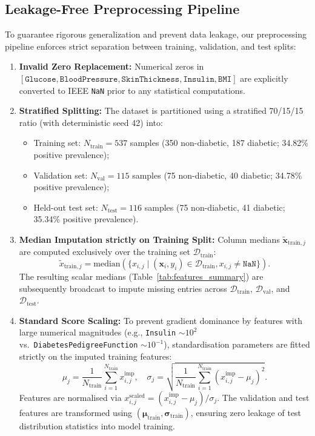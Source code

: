 \documentclass[11pt,a4paper]{article}
\begin{document}
\subsection{Leakage-Free Preprocessing Pipeline}
To guarantee rigorous generalization and prevent data leakage, our preprocessing pipeline enforces strict separation between training, validation, and test splits:
\begin{enumerate}[leftmargin=*]
    \item \textbf{Invalid Zero Replacement:} Numerical zeros in $[\texttt{Glucose}, \texttt{BloodPressure}, \texttt{SkinThickness}, \texttt{Insulin}, \texttt{BMI}]$ are explicitly converted to IEEE \texttt{NaN} prior to any statistical computations.
    \item \textbf{Stratified Splitting:} The dataset is partitioned using a stratified 70/15/15 ratio (with deterministic seed 42) into:
    \begin{itemize}
        \item Training set: $N_{\text{train}} = 537$ samples (350 non-diabetic, 187 diabetic; 34.82\% positive prevalence);
        \item Validation set: $N_{\text{val}} = 115$ samples (75 non-diabetic, 40 diabetic; 34.78\% positive prevalence);
        \item Held-out test set: $N_{\text{test}} = 116$ samples (75 non-diabetic, 41 diabetic; 35.34\% positive prevalence).
    \end{itemize}
    \item \textbf{Median Imputation strictly on Training Split:} Column medians $\tilde{\mathbf{x}}_{\text{train}, j}$ are computed exclusively over the training set $\mathcal{D}_{\text{train}}$:
    \begin{equation}
        \tilde{x}_{\text{train}, j} = \text{median}\left(\{x_{i, j} \mid (\mathbf{x}_i, y_i) \in \mathcal{D}_{\text{train}}, x_{i, j} \neq \texttt{NaN}\}\right).
    \end{equation}
    The resulting scalar medians (Table~\ref{tab:features_summary}) are subsequently broadcast to impute missing entries across $\mathcal{D}_{\text{train}}$, $\mathcal{D}_{\text{val}}$, and $\mathcal{D}_{\text{test}}$.
    \item \textbf{Standard Score Scaling:} To prevent gradient dominance by features with large numerical magnitudes (e.g., \texttt{Insulin} $\sim 10^2$ vs.\ \texttt{DiabetesPedigreeFunction} $\sim 10^{-1}$), standardisation parameters are fitted strictly on the imputed training features:
    \begin{equation}
        \mu_j = \frac{1}{N_{\text{train}}} \sum_{i=1}^{N_{\text{train}}} x_{i, j}^{\text{imp}}, \quad \sigma_j = \sqrt{\frac{1}{N_{\text{train}}} \sum_{i=1}^{N_{\text{train}}} (x_{i, j}^{\text{imp}} - \mu_j)^2}.
    \end{equation}
    Features are normalised via $x_{i, j}^{\text{scaled}} = (x_{i, j}^{\text{imp}} - \mu_j) / \sigma_j$. The validation and test features are transformed using $(\boldsymbol{\mu}_{\text{train}}, \boldsymbol{\sigma}_{\text{train}})$, ensuring zero leakage of test distribution statistics into model training.
\end{enumerate}
\end{document}

